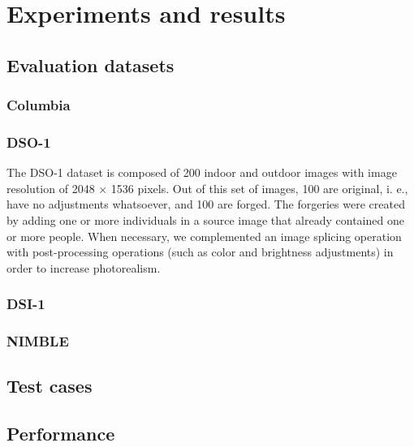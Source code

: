 \chapter{Experiments and results}

\section{Evaluation datasets}

\subsection{Columbia}

\subsection{DSO-1}

The DSO-1 dataset is composed of 200 indoor and outdoor images with image resolution of 2048 × 1536 pixels. Out of this set of images, 100 are original, i. e., have no adjustments whatsoever, and 100 are forged. The forgeries were created by adding one or more individuals in a source image that already contained one or more people. When necessary, we complemented an image splicing operation with post-processing operations (such as color and brightness adjustments) in order to increase photorealism.

\subsection{DSI-1}

\subsection{NIMBLE}

\section{Test cases}

\section{Performance}
